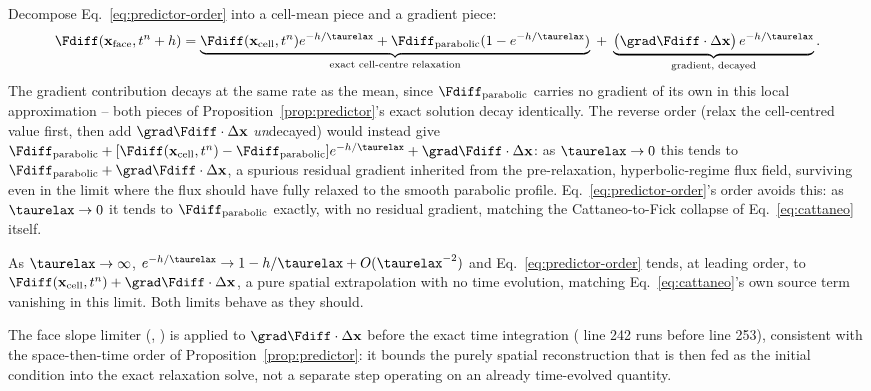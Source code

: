 \begin{remark}
Decompose Eq.~\eqref{eq:predictor-order} into a cell-mean piece and a
gradient piece:
\begin{equation}
  \Fdiff(\mathbf x_{\rm face},t^n+h) =
  \underbrace{\Fdiff(\mathbf x_{\rm cell},t^n)e^{-h/\taurelax}
  +\Fdiff_{\rm parabolic}(1-e^{-h/\taurelax})}_{\text{exact cell-centre relaxation}}
  \;+\;
  \underbrace{\big(\grad\Fdiff\cdot\Delta\mathbf x\big)\,e^{-h/\taurelax}}_{\text{gradient, decayed}} .
\end{equation}
The gradient contribution decays at the same rate as the mean, since
$\Fdiff_{\rm parabolic}$ carries no gradient of its own in this local approximation
-- both pieces of Proposition~\ref{prop:predictor}'s exact solution decay
identically. The reverse order (relax the cell-centred value first, then
add $\grad\Fdiff\cdot\Delta\mathbf x$ \emph{un}decayed) would instead give
$\Fdiff_{\rm parabolic}+[\Fdiff(\mathbf x_{\rm cell},t^n)-\Fdiff_{\rm parabolic}]e^{-h/\taurelax}
+\grad\Fdiff\cdot\Delta\mathbf x$: as $\taurelax\to0$ this tends to
$\Fdiff_{\rm parabolic}+\grad\Fdiff\cdot\Delta\mathbf x$, a spurious residual
gradient inherited from the pre-relaxation, hyperbolic-regime flux field,
surviving even in the limit where the flux should have fully relaxed to
the smooth parabolic profile. Eq.~\eqref{eq:predictor-order}'s order
avoids this: as $\taurelax\to0$ it tends to $\Fdiff_{\rm parabolic}$ exactly, with no
residual gradient, matching the Cattaneo-to-Fick collapse of
Eq.~\eqref{eq:cattaneo} itself.
\end{remark}

\begin{remark}
As $\taurelax\to\infty$, $e^{-h/\taurelax}\to1-h/\taurelax+O(\taurelax^{-2})$
and Eq.~\eqref{eq:predictor-order} tends, at leading order, to
$\Fdiff(\mathbf x_{\rm cell},t^n)+\grad\Fdiff\cdot\Delta\mathbf x$, a
pure spatial extrapolation with no time evolution, matching
Eq.~\eqref{eq:cattaneo}'s own source term vanishing in this limit. Both
limits behave as they should.
\end{remark}

The face slope limiter (,
) is applied to
$\grad\Fdiff\cdot\Delta\mathbf x$ before the exact time integration
( line 242 runs before line 253), consistent
with the space-then-time order of Proposition~\ref{prop:predictor}: it
bounds the purely spatial reconstruction that is then fed as the initial
condition into the exact relaxation solve, not a separate step operating
on an already time-evolved quantity.

